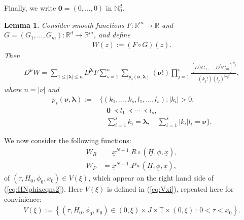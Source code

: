 \documentclass[reqno,12pt]{amsart}
\newcommand{\eqlab}[1]{\label{eq:#1}}
\renewcommand{\eqref}[1]{(\ref{eq:#1})}
\newcommand{\lemmalab}[1]{\label{lemma:#1}}
\newtheorem{lemma}[theorem]{Lemma}
\numberwithin{equation}{section}
\begin{document}
Finally, we write $\mathbf 0=(0,\ldots,0)$ in $\mathbb N_0^d$. 
\begin{lemma}\lemmalab{faa}
\cite[Theorem 2.1]{constantine1996a}
Consider smooth functions $F:\mathbb R^m\rightarrow \mathbb R$ and $G=(G_1,\ldots,G_m):\mathbb R^d\rightarrow \mathbb R^m$, and define
\begin{align*}
 W(z) := (F\circ G)(z).
\end{align*}
Then 
\begin{align}
D^{\mathbf \nu} W = \sum_{1\le \vert \mathbf \lambda \vert \le n} D^{\mathbf \lambda} F \sum_{s=1}^n \sum_{p_s(\mathbf \nu,\mathbf \lambda)} (\mathbf \nu!) \prod_{j=1}^s \frac{[D^{l_j} G_1,\cdots,D^{l_j} G_m ]^{k_j} }{(k_j!)(l_j)^{\vert k_j\vert}},\eqlab{DnuW}
\end{align}
where $n=\vert \nu\vert$ and 
\begin{equation}\eqlab{ps}
\begin{aligned}
 p_s(\mathbf \nu,\mathbf \lambda):=&\bigg\{(k_1,\ldots,k_s,l_1,\ldots,l_s):\vert k_i\vert >0,\\
 &\quad \mathbf 0\prec l_1\prec\cdots \prec l_s,\\ 
 &\quad \sum_{i=1}^s k_i = \mathbf \lambda,\quad \sum_{i=1}^s \vert k_i\vert l_i = \mathbf \nu\bigg\}.
\end{aligned}
\end{equation}

\end{lemma}
We now consider the following functions:
\begin{align*}
W_R&=\underline x^{N+1}. R\circ (\underline H,\underline \phi,\underline x),\\
W_P& =\underline x^{N-1}. P\circ (\underline H,\underline \phi,\underline x),
\end{align*}
of $(\tau,H_0,\phi_0,x_0)\in V(\xi)$, 
which appear on the right hand side of \eqref{HNphixeqns2}. Here $V(\xi)$ is defined in \eqref{Vxi}, repeated here for convinience:
\begin{align*}
V(\xi):=\left\{(\tau,H_0,\phi_0,x_0) \in (0,\xi)\times J\times \mathbb T\times  (0,\xi)\,:\,0<\tau<x_0\right\}.
\end{align*}
\end{document}

